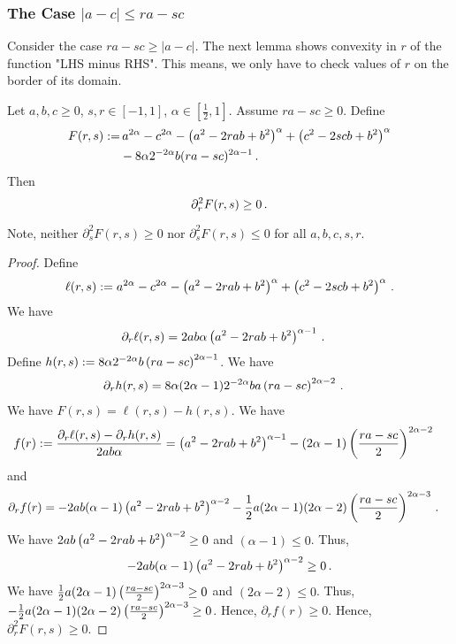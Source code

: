 \subsubsection{The Case $|a-c| \leq ra-sc$}
%
Consider the case $ra-sc \geq |a-c|$. The next lemma shows convexity in $r$ of the function "LHS minus RHS". This means, we only have to check values of $r$ on the border of its domain.
%
\begin{lemma}[Convexity in $r$]\label{lmm:ddr}
	Let $a,b,c\geq0$, $s,r\in[-1,1]$, $\alpha\in[\frac12,1]$.
	Assume $ra - sc \geq 0$.
	Define 
	\begin{align*}
		F(r,s) 
		:= 
		&\,a^{2\alpha}-c^{2\alpha}-\left( a^2-2rab+b^2 \right)^\alpha+\left( c^2-2scb+b^2 \right)^\alpha 
		\\&-
		8 \alpha 2^{-2\alpha} b (ra - sc)^{2\alpha-1}
		\, .
	\end{align*}
	Then
	\begin{equation*}
		\partial_r^2 F(r,s) \geq 0
		\, .
	\end{equation*}
\end{lemma}
%
Note, neither $\partial_s^2 F(r,s) \geq 0$ nor $\partial_s^2 F(r,s) \leq 0$ for all $a,b,c,s,r$.
%
\begin{proof}
	Define
	\begin{equation*}
		\ell(r,s) := a^{2\alpha}-c^{2\alpha}-\left( a^2-2rab+b^2 \right)^\alpha+\left( c^2-2scb+b^2 \right)^\alpha 
		\, .
	\end{equation*}
	We have
	\begin{align*}
		\partial_r \ell(r,s) &= 2ab\alpha\left( a^2-2rab+b^2 \right)^{\alpha-1}\, .
	\end{align*}
	Define $h(r,s) := 8 \alpha 2^{-2\alpha} b \left( ra - sc \right)^{2\alpha-1}$. We have
	\begin{align*}
		\partial_r h(r,s) &= 8 \alpha (2\alpha-1) 2^{-2\alpha} b a \left( ra - sc \right)^{2\alpha-2}\, .
	\end{align*}
	We have $F(r,s) = \ell(r,s)-h(r,s)$.
	We have
	\begin{align*}
		f(r) :=	 \frac{	\partial_r \ell(r,s)-\partial_r h(r,s)}{2ab\alpha} &= \left( a^2-2rab+b^2 \right)^{\alpha-1} - (2\alpha-1) \left( \frac{ra - sc}{2} \right)^{2\alpha-2}
	\end{align*}
	and 
	\begin{align*}
		\partial_r f(r) 
		&= 
		-2ab(\alpha-1) \left( a^2-2rab+b^2 \right)^{\alpha-2} 
		- \frac12 a(2\alpha-1)(2\alpha-2) \left( \frac{ra - sc}{2} \right)^{2\alpha-3} 
		\, .
	\end{align*}
	We have $2ab \left( a^2-2rab+b^2 \right)^{\alpha-2} \geq 0$ and $(\alpha-1) \leq 0$. Thus,
	\begin{equation*}
		-2ab(\alpha-1) \left( a^2-2rab+b^2 \right)^{\alpha-2} \geq 0\, .
	\end{equation*}
	We have $\frac12 a(2\alpha-1) \left( \frac{ra - sc}{2} \right)^{2\alpha-3} \geq 0$ and  $(2\alpha-2)\leq 0$. Thus, $-\frac12 a(2\alpha-1)(2\alpha-2) \left( \frac{ra - sc}{2} \right)^{2\alpha-3} \geq 0$. Hence,	$\partial_r f(r) \geq 0$. Hence, $\partial_r^2 F(r,s) \geq 0$.
\end{proof}
%
%
%
%
%
